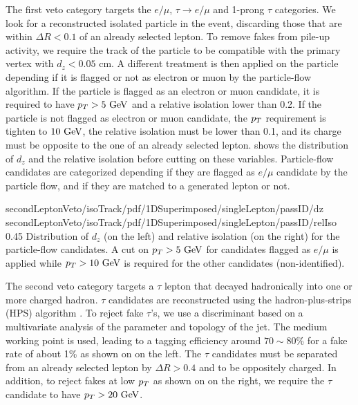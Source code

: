     The first veto category targets the $e/\mu$, $\tau \rightarrow e/\mu$ and
    1-prong $\tau$ categories. We look for a reconstructed isolated particle in the event,
    discarding those that are within $\Delta R < 0.1$ of an already selected lepton. To
    remove fakes from pile-up activity, we require the track of the particle to be
    compatible with the primary vertex with $d_z < 0.05$ cm. A different treatment is then
    applied on the particle depending if it is flagged or not as electron or muon by the
    particle-flow algorithm. If the particle is flagged as an electron or muon candidate,
    it is required to have $p_T > 5~\text{GeV}$ and a relative isolation lower than 0.2.
    If the particle is not flagged as electron or muon candidate, the $p_T$ requirement
    is tighten to $10~\text{GeV}$, the relative isolation must be lower than 0.1, and its charge
    must be opposite to the one of an already selected lepton.
     shows the distribution of $d_z$ and the
    relative isolation before cutting on these variables. Particle-flow candidates are categorized depending if
    they are flagged as $e/\mu$ candidate by the particle flow, and if they are matched to a
    generated lepton or not.

                     {secondLeptonVeto/isoTrack/pdf/1DSuperimposed/singleLepton/passID/dz}
                     {secondLeptonVeto/isoTrack/pdf/1DSuperimposed/singleLepton/passID/relIso}
                     {0.45}
                     {Distribution of $d_z$ (on the left) and relative isolation (on the right)
                     for the particle-flow candidates. A cut on $p_T > 5~\text{GeV}$ for candidates
                     flagged as $e/\mu$ is applied while $p_T > 10~\text{GeV}$ is required for
                     the other candidates (non-identified).}

    The second veto category targets a $\tau$ lepton that decayed hadronically
    into one or more charged hadron. $\tau$ candidates are reconstructed using the
    hadron-plus-strips (HPS) algorithm \cite{TauID}. To reject fake
    $\tau$'s, we use a discriminant based on a multivariate analysis of the parameter and
    topology of the jet. The medium working point is used, leading to a tagging efficiency
    around $70\sim80$\% for a fake rate of about 1\% as shown on 
    on the left. The $\tau$ candidates must be separated from an already selected lepton
    by $\Delta R > 0.4$ and to be oppositely charged. In addition, to reject fakes at low
    $p_T$ as shown on  on the right, we require the $\tau$
    candidate to have $p_T > 20~\text{GeV}$.

